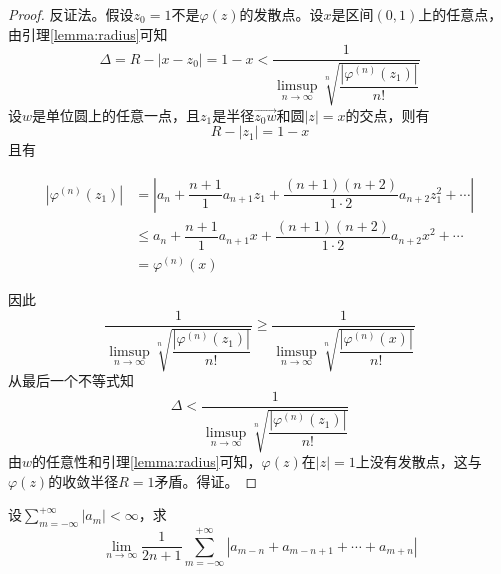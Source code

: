\begin{proof}

    反证法。假设$z_0 = 1$不是$\varphi(z)$的发散点。设$x$是区间$(0, 1)$上的任意点，由引理\ref{lemma:radius}可知
    \[\Delta = R - |x - z_0| = 1 - x < \dfrac{1}{\limsup\limits_{n \to \infty}{\sqrt[n]{\dfrac{|\varphi^{(n)}(z_1)|}{n!}}}}\]
    设$w$是单位圆上的任意一点，且$z_1$是半径$\vec{z_0w}$和圆$|z| = x$的交点，则有
    \[R - |z_1| = 1 - x\]
    且有
    
    \begin{align*}
        |\varphi^{(n)}(z_1)| & = \left| a_n + \dfrac{n + 1}{1} a_{n + 1}z_1 + \dfrac{(n + 1)(n + 2)}{1 \cdot 2}a_{n + 2}z_1^2 + \cdots \right| \\
        & \leq a_n + \dfrac{n + 1}{1} a_{n + 1}x + \dfrac{(n + 1)(n + 2)}{1 \cdot 2}a_{n + 2}x^2 + \cdots \\
        & = \varphi^{(n)}(x)
    \end{align*}

    因此
    \[\dfrac{1}{\limsup\limits_{n \to \infty}{\sqrt[n]{\dfrac{|\varphi^{(n)}(z_1)|}{n!}}}} \geq \dfrac{1}{\limsup\limits_{n \to \infty}{\sqrt[n]{\dfrac{|\varphi^{(n)}(x)|}{n!}}}}\]
    从最后一个不等式知
    \[\Delta < \dfrac{1}{\limsup\limits_{n \to \infty}{\sqrt[n]{\dfrac{|\varphi^{(n)}(z_1)|}{n!}}}}\]
    由$w$的任意性和引理\ref{lemma:radius}可知，$\varphi(z)$在$|z| = 1$上没有发散点，这与$\varphi(z)$的收敛半径$R = 1$矛盾。得证。

\end{proof}

\begin{proposition}

    设$\sum\limits_{m = -\infty}^{+\infty}{|a_m|} < \infty$，求
    \[\lim\limits_{n \to \infty}{\dfrac{1}{2n + 1}\sum\limits_{m = -\infty}^{+\infty}{|a_{m - n} + a_{m - n + 1} + \cdots + a_{m + n}|}}\]

\end{proposition}

